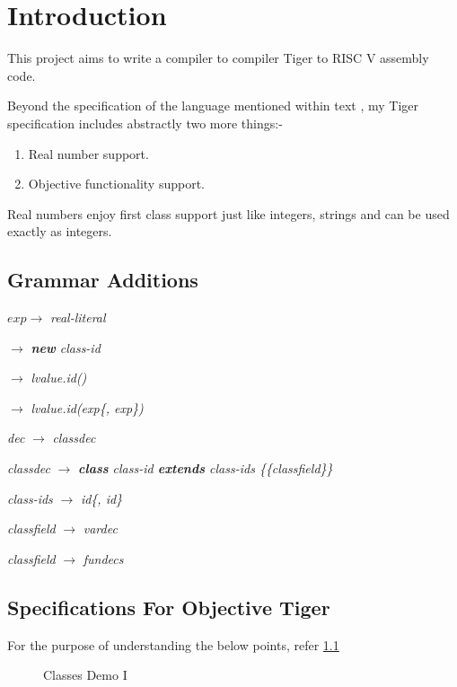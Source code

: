\chapter{Introduction}

This project aims to write a compiler to compiler Tiger to RISC V assembly code.


Beyond the specification of the language mentioned within text \cite{tigerbook}, my Tiger specification includes abstractly two more things:-

\begin{enumerate}
	\item Real number support.
	\item Objective functionality support.
\end{enumerate}

Real numbers enjoy first class support just like integers, strings and can be used exactly as integers.

\section{Grammar Additions}

$exp \rightarrow$ \textit{real-literal}

$\rightarrow$ \textit{\textbf{new} class-id}

$\rightarrow$ \textit{lvalue.id()}

$\rightarrow$ \textit{lvalue.id(exp\{, exp\})}

\textit{dec} $\rightarrow$ \textit{classdec}

\textit{classdec} $\rightarrow$ \textit{\textbf{class} class-id \textbf{extends} class-ids \{\{classfield\}\}}

\textit{class-ids} $\rightarrow$ \textit{id\{, id\}}

\textit{classfield} $\rightarrow$ \textit{vardec}

\textit{classfield} $\rightarrow$ \textit{fundecs}

\section{Specifications For Objective Tiger}

For the purpose of understanding the below points, refer \ref{fig:wmi}

\begin{figure}
	\centering
	\caption{Classes Demo I}
	\label{fig:wmi}
\end{figure}

